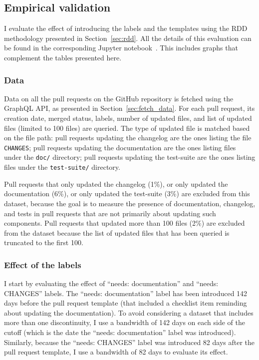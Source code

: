 \subsection{Empirical validation}

\label{sec:rdd1}

I evaluate the effect of introducing the labels and the templates using the RDD methodology presented in Section~\ref{sec:rdd}.
All the details of this evaluation can be found in the corresponding Jupyter notebook~\cite{zimmermann2019templates}.
This includes graphs that complement the tables presented here.

\subsubsection{Data}

Data on all the pull requests on the GitHub repository is fetched using the GraphQL API, as presented in Section~\ref{sec:fetch_data}.
For each pull request, its creation date, merged status, labels, number of updated files, and list of updated files (limited to 100 files) are queried.
The type of updated file is matched based on the file path: pull requests updating the changelog are the ones listing the file \verb|CHANGES|; pull requests updating the documentation are the ones listing files under the \verb|doc/| directory; pull requests updating the test-suite are the ones listing files under the \verb|test-suite/| directory.

Pull requests that only updated the changelog (1\%), or only updated the documentation (6\%), or only updated the test-suite (3\%) are excluded from this dataset, because the goal is to measure the presence of documentation, changelog, and tests in pull requests that are not primarily about updating such components.
Pull requests that updated more than 100 files (2\%) are excluded from the dataset because the list of updated files that has been queried is truncated to the first 100.

\subsubsection{Effect of the labels}

I start by evaluating the effect of ``needs: documentation'' and ``needs: CHANGES'' labels.
The ``needs: documentation'' label has been introduced 142 days before the pull request template (that included a checklist item reminding about updating the documentation).
To avoid considering a dataset that includes more than one discontinuity, I use a bandwidth of 142 days on each side of the cutoff (which is the date the ``needs: documentation'' label was introduced).
Similarly, because the ``needs: CHANGES'' label was introduced 82 days after the pull request template, I use a bandwidth of 82 days to evaluate its effect.

